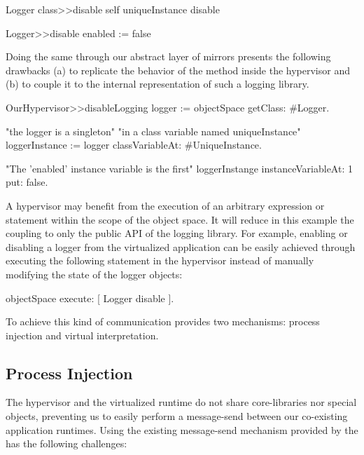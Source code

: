 \begin{code}
Logger class>>disable
	self uniqueInstance disable
	
Logger>>disable
	enabled := false
\end{code}

Doing the same through our abstract layer of mirrors presents the following drawbacks (a) to replicate the behavior of the  method inside the hypervisor and (b) to couple it to the internal representation of such a logging library. 

\begin{code}
OurHypervisor>>disableLogging
	logger := objectSpace getClass: #Logger.

	"the logger is a singleton"
	"in a class variable named uniqueInstance"
	loggerInstance := logger classVariableAt: #UniqueInstance.

	"The 'enabled' instance variable is the first"
	loggerInstange instanceVariableAt: 1 put: false.
\end{code}

A hypervisor may benefit from the execution of an arbitrary expression or statement within the scope of the object space. It will reduce in this example the coupling to only the public API of the logging library. For example, enabling or disabling a logger from the virtualized application can be easily achieved through executing the following statement in the hypervisor instead of manually modifying the state of the logger objects:

\begin{code}
objectSpace execute: [ Logger disable ].
\end{code}

To achieve this kind of communication \Vtt provides two mechanisms: process injection and virtual interpretation.

\subsection{Process Injection}
The hypervisor and the virtualized runtime do not share core-libraries nor special objects, preventing us to easily perform a message-send between our co-existing application runtimes. Using the existing message-send mechanism provided by the \VM has the following challenges:

